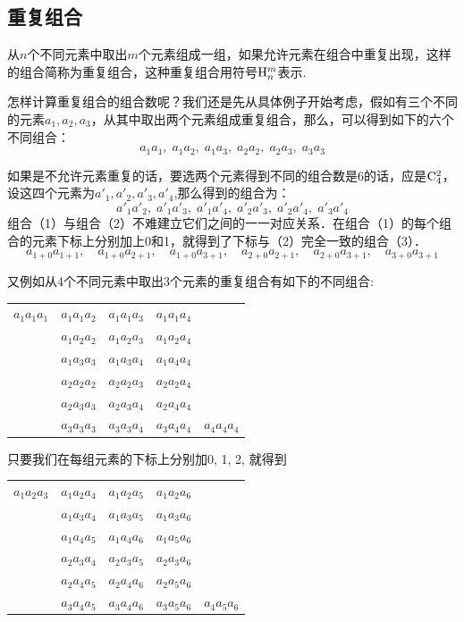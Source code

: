 \subsection{重复组合}
从$n$个不同元素中取出$m$个元素组成一组，如果允许元素在组合中重复出现，这样的组合简称为重复组合，这种重复组合用符号${\rm H}^{m}_{n}$表示.

怎样计算重复组合的组合数呢？我们还是先从具体例子开始考虑，假如有三个不同的元素$a_1,a_2,a_3$，从其中取出两个元素组成重复组合，那么，可以得到如下的六个不同组合：
\begin{equation}
a_1a_1,\; a_1a_2,\; a_1a_3,\; a_2a_2,\; a_2a_3,\; a_3a_3 \tag{1}
\end{equation}

如果是不允许元素重复的话，要选两个元素得到不同的组合数是6的话，应是${\rm C}^{2}_{4}$，设这四个元素为$a'_1,a'_2,a'_3,a'_4$,那么得到的组合为：
\begin{equation}
a'_1a'_2,\; a'_1a'_3,\; a'_1a'_4,\; a'_2a'_3,\; a'_2a'_4,\; a'_3a'_4 \tag{2}
\end{equation}
组合（1）与组合（2）不难建立它们之间的一一对应关系．在组合（1）的每个组合的元素下标上分别加上0和1，就得到了下标与（2）完全一致的组合（3）．
\begin{equation}
a_{1+0}a_{1+1},\quad a_{1+0}a_{2+1},\quad a_{1+0}a_{3+1},\quad a_{2+0}a_{2+1},\quad a_{2+0}a_{3+1},\quad a_{3+0}a_{3+1}
\tag{3}
\end{equation}

又例如从4个不同元素中取出3个元素的重复组合有如下的不同组合:
\begin{center}
\begin{tabular}{ccccc}
    $a_{1}a_{1}a_{1}$&$a_{1}a_{1}a_{2}$&$a_{1}a_1a_{3}$&$a_{1}a_{1}a_{4}$\\
    &$a_{1}a_{2}a_{2}$&$a_{1}a_{2}a_{3}$&$a_{1}a_{2}a_{4}$\\
    &$a_{1}a_{3}a_{3}$&$a_{1}a_{3}a_{4}$&$a_{1}a_{4}a_{4}$\\
    &$a_{2}a_{2}a_{2}$&$a_{2}a_{2}a_{3}$&$a_{2}a_{2}a_{4}$\\
    &$a_{2}a_{3}a_{3}$&$a_{2}a_{3}a_{4}$&$a_{2}a_{4}a_{4}$\\
 &$a_{3}a_{3}a_{3}$&$a_{3}a_{3}a_{4}$&$a_{3}a_{4}a_{4}$&$a_{4}a_{4}a_{4}$\\
\end{tabular}
\end{center}

只要我们在每组元素的下标上分别加0, 1, 2, 就得到
\begin{center}
\begin{tabular}{ccccc}
    $a_{1}a_{2}a_{3}$&$a_{1}a_{2}a_{4}$&$a_{1}a_{2}a_{5}$&$a_{1}a_{2}a_{6}$\\
 & $a_{1}a_{3}a_{4}$&$a_{1}a_{3}a_{5}$&$a_{1}a_{3}a_{6}$\\
 &$a_{1}a_{4}a_{5}$&$a_{1}a_{4}a_{6}$&$a_{1}a_{5}a_{6}$\\
 &$a_{2}a_{3}a_{4}$&$a_{2}a_{3}a_{5}$&$a_{2}a_{3}a_{6}$\\
 &$a_{2}a_{4}a_{5}$&$a_{2}a_{4}a_{6}$&$a_{2}a_{5}a_{6}$\\
 &$a_{3}a_{4}a_{5}$&$a_{3}a_{4}a_{6}$&$a_{3}a_{5}a_{6}$&$a_{4}a_{5}a_{6}$
\end{tabular}
\end{center}

